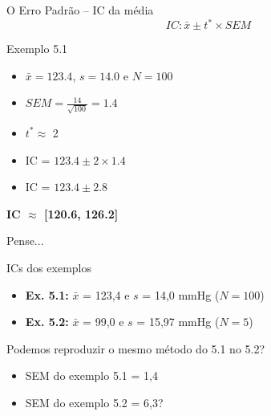 \documentclass{beamer}
\begin{document}
\begin{frame}{\scriptsize O Erro Padrão -- IC da média}
  \begin{displaymath}
    IC: \bar{x} \pm t^{*} \times SEM
  \end{displaymath}
  \begin{exampleblock}{Exemplo 5.1}
    \footnotesize
    \begin{exampleblock}{}
    \begin{itemize}
      \tiny
    \item $\bar{x} = 123.4$, $s = 14.0$ e $N = 100$
    \item $SEM = \frac{14}{\sqrt{100}} = 1.4$
    \item $t^{*} \approx$ 2
    \end{itemize}
  \end{exampleblock}
    \begin{exampleblock}{}
      \begin{itemize}
        \tiny
      \item IC =  $123.4 \pm 2 \times 1.4$
      \item IC =  $123.4 \pm 2.8$
      \end{itemize}
  \end{exampleblock}
    \begin{exampleblock}{}
      \footnotesize
      \centering
      {\bf IC $\approx$ [120.6, 126.2]}
    \end{exampleblock}
  \end{exampleblock}
\end{frame}

\begin{frame}{\scriptsize Pense...}
  \begin{exampleblock}{ICs dos exemplos}
    \footnotesize
    \begin{itemize}
      \footnotesize
    \item {\bf Ex. 5.1:} $\bar{x}$ = 123,4 e $s$ = 14,0 mmHg ($N=100$)
    \item {\bf Ex. 5.2:} $\bar{x}$ = 99,0 e $s$ = 15,97 mmHg ($N=5$)
    \end{itemize}
  \end{exampleblock}
    \bigskip
  \begin{block}{Podemos reproduzir o mesmo método do 5.1 no 5.2?}
    \footnotesize
  \begin{itemize}
    \footnotesize
  \item SEM do exemplo 5.1 = 1,4
  \item SEM do exemplo 5.2 = 6,3?
  \end{itemize}
  \end{block}
\end{frame}
\end{document}
